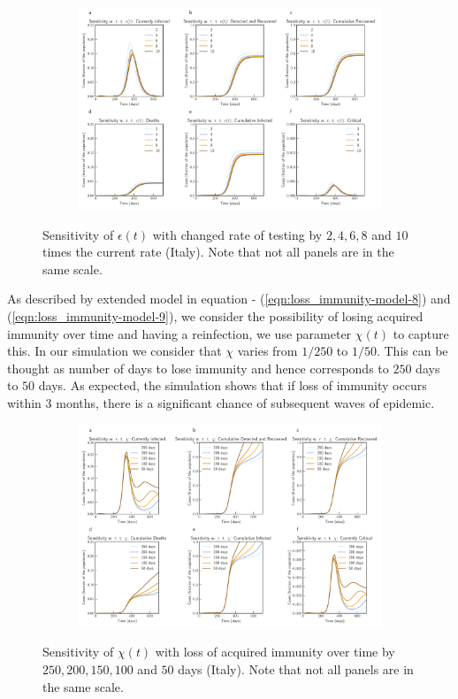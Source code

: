 \documentclass[authoryear,preprint]{elsarticle}
\begin{document}
\begin{figure}[t!]
	\centering
	\begin{subfigure}[b]{\textwidth}
		\centering
		\includegraphics[width=1\linewidth]{Italy_sensitivity_epsilon.pdf}
	\end{subfigure}
	\caption{Sensitivity of $\epsilon(t)$ with changed rate of testing by $2, 4, 6, 8$ and $10$ times the current rate (Italy). Note that not all panels are in the same scale.}
	\label{fig3B} 
\end{figure}
%
As described by extended model in equation - (\ref{eqn:loss_immunity-model-8}) and (\ref{eqn:loss_immunity-model-9}), we consider the possibility of losing acquired immunity over time and having a reinfection, we use parameter $\chi(t)$ to capture this. In our simulation we consider that $\chi$ varies from $1/250$ to $1/50$. This can be thought as number of days to lose immunity and hence corresponds to $250$ days to $50$ days. As expected, the simulation shows that if loss of immunity occurs within 3 months, there is a significant chance of subsequent waves of epidemic.  

%
\begin{figure}[t!]
	\centering
	\begin{subfigure}[b]{\textwidth}
		\centering
		\includegraphics[width=1\linewidth]{Italy_scenario_reinfection.pdf}
	\end{subfigure}
	\caption{Sensitivity of $\chi(t)$ with loss of acquired immunity over time by $250, 200, 150, 100$ and $50$ days (Italy). Note that not all panels are in the same scale.}
	\label{fig4} 
\end{figure}
%
\end{document}
